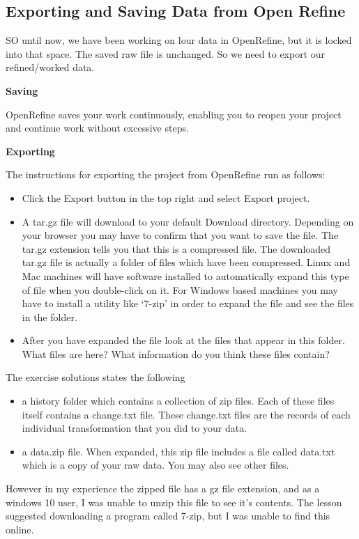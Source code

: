 \documentclass{article}
\begin{document}
\subsection{Exporting and Saving Data from Open Refine}

SO until now, we have been working on lour data in OpenRefine, but it is locked into that space. The saved raw file is unchanged. So we need to export our refined/worked data.

\textbf{Saving}

OpenRefine saves your work continuously, enabling you to reopen your project and continue work without excessive steps.

\textbf{Exporting}
\label{Exporting}

The instructions for exporting the project from OpenRefine run as follows: 
\begin{itemize}
    \item Click the Export button in the top right and select Export project.
    \item A tar.gz file will download to your default Download directory. Depending on your browser you may have to confirm that you want to save the file. The tar.gz extension tells you that this is a compressed file. The downloaded tar.gz file is actually a folder of files which have been compressed. Linux and Mac machines will have software installed to automatically expand this type of file when you double-click on it. For Windows based machines you may have to install a utility like ‘7-zip’ in order to expand the file and see the files in the folder.
    \item After you have expanded the file look at the files that appear in this folder. What files are here? What information do you think these files contain?
\end{itemize}

The exercise solutions states the following
\begin{itemize}
    \item  a history folder which contains a collection of zip files. Each of these files itself contains a change.txt file. These change.txt files are the records of each individual transformation that you did to your data.
    \item a data.zip file. When expanded, this zip file includes a file called data.txt which is a copy of your raw data. You may also see other files.
\end{itemize}

However in my experience the zipped file has a gz file extension, and as a windows 10 user, I was unable to unzip this file to see it's contents. The lesson suggested downloading a program called 7-zip, but I was unable to find this online. 
\end{document}
